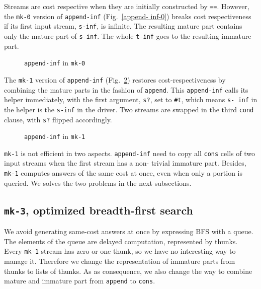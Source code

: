 \documentclass[format=acmlarge, review=true, authordraft=true]{acmart}
\begin{document}
Streams are cost respective when they are initially constructed by \texttt{==}. 
However, the \texttt{mk-0} version of \texttt{append-inf} (Fig.~\ref{append-
inf-0}) breaks cost respectiveness if its first input stream, \texttt{s-inf}, 
is infinite. The resulting mature part contains only the mature part of 
\texttt{s-inf}. The whole \texttt{t-inf} goes to the resulting immature part.

\begin{figure}
	 	
	 \caption{\texttt{append-inf} in \texttt{mk-0}}
	 \label{append-inf-0}
\end{figure}

The \texttt{mk-1} version of \texttt{append-inf} (Fig.~\ref{append-inf-1}) 
restores cost-respectiveness by combining the mature parts in the fashion of 
\texttt{append}. This \texttt{append-inf} calls its helper immediately, with 
the first argument, \texttt{s?}, set to \texttt{\#{}t}, which means \texttt{s-
inf} in the helper is the \texttt{s-inf} in the driver. Two streams are swapped 
in the third \texttt{cond} clause, with \texttt{s?} flipped accordingly.

\begin{figure}
	 	
	 \caption{\texttt{append-inf} in \texttt{mk-1}}
	 \label{append-inf-1}
\end{figure}

\texttt{mk-1} is not efficient in two aspects. \texttt{append-inf} need to copy 
all \texttt{cons} cells of two input streams when the first stream has a non-
trivial immature part. Besides, \texttt{mk-1} computes answers of the same cost 
at once, even when only a portion is queried. We solves the two problems in the 
next subsections.

\subsection{\texttt{mk-3}, optimized breadth-first search}

We avoid generating same-cost answers at once by expressing BFS with a queue. 
The elements of the queue are delayed computation, represented by thunks. Every 
\texttt{mk-1} stream has zero or one thunk, so we have no interesting way to 
manage it. Therefore we change the representation of immature parts from thunks 
to lists of thunks. As as consequence, we also change the way to combine mature 
and immature part from \texttt{append} to \texttt{cons}. 
\end{document}
